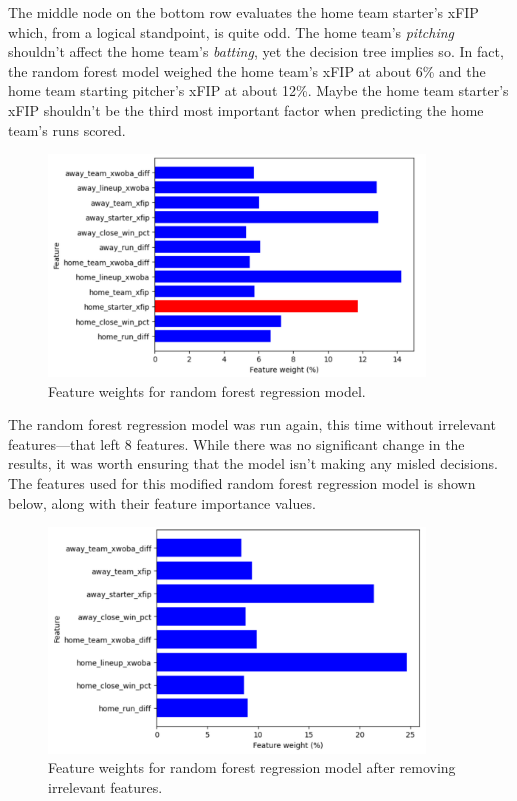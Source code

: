 \documentclass{paper}
\begin{document}
The middle node on the bottom row evaluates the home team starter's xFIP which, from a logical standpoint, is quite odd. The home team's \textit{pitching} shouldn't affect the home team's \textit{batting}, yet the decision tree implies so. In fact, the random forest model weighed the home team's xFIP at about 6\% and the home team starting pitcher's xFIP at about 12\%. Maybe the home team starter's xFIP shouldn't be the third most important factor when predicting the home team's runs scored.

\begin{figure}[H]
  \centering
  \includegraphics[width=10cm]{fig10}
  \caption{Feature weights for random forest regression model.}
\end{figure}

The random forest regression model was run again, this time without irrelevant features---that left 8 features. While there was no significant change in the results, it was worth ensuring that the model isn't making any misled decisions. The features used for this modified random forest regression model is shown below, along with their feature importance values.

\begin{figure}[H]
  \centering
  \includegraphics[width=10cm]{fig11}
  \caption{Feature weights for random forest regression model after removing irrelevant features.}
\end{figure}
\end{document}
